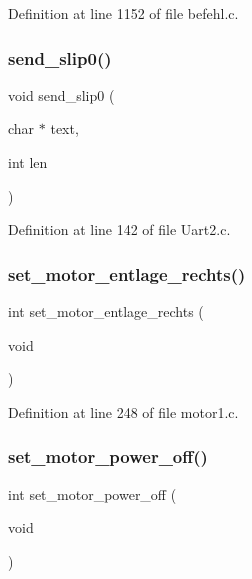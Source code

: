 Definition at line 1152 of file befehl.\+c.

\mbox{\label{befehl_8c_a369624c8eb4925edacf7bd8773dceaa0}} 
\subsubsection{send\+\_\+slip0()}
{\footnotesize\ttfamily void send\+\_\+slip0 (\begin{DoxyParamCaption}\item[{char $\ast$}]{text,  }\item[{int}]{len }\end{DoxyParamCaption})}



Definition at line 142 of file Uart2.\+c.

\mbox{\label{befehl_8c_ae7371f4fed363ba54f2f894ac3720c06}} 
\subsubsection{set\+\_\+motor\+\_\+entlage\+\_\+rechts()}
{\footnotesize\ttfamily int set\+\_\+motor\+\_\+entlage\+\_\+rechts (\begin{DoxyParamCaption}\item[{void}]{ }\end{DoxyParamCaption})}



Definition at line 248 of file motor1.\+c.

\mbox{\label{befehl_8c_aca930076cffa70b62efe0f7f4281f80d}} 
\subsubsection{set\+\_\+motor\+\_\+power\+\_\+off()}
{\footnotesize\ttfamily int set\+\_\+motor\+\_\+power\+\_\+off (\begin{DoxyParamCaption}\item[{void}]{ }\end{DoxyParamCaption})}



